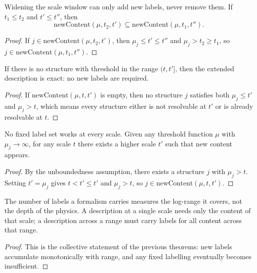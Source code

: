\begin{theorem}
Widening the scale window can only add new labels, never remove them. If $t_1 \leq t_2$ and $t' \leq t''$, then
\[\text{newContent}(\mu, t_2, t') \subseteq \text{newContent}(\mu, t_1, t'').\]
\end{theorem}
\begin{proof}
If $j \in \text{newContent}(\mu, t_2, t')$, then $\mu_j \leq t' \leq t''$ and $\mu_j > t_2 \geq t_1$, so $j \in \text{newContent}(\mu, t_1, t'')$.
\end{proof}

\begin{theorem}
If there is no structure with threshold in the range $(t, t']$, then the extended description is exact:
no new labels are required.
\end{theorem}
\begin{proof}
If $\text{newContent}(\mu, t, t')$ is empty, then no structure $j$ satisfies both $\mu_j \leq t'$ and $\mu_j > t$,
which means every structure either is not resolvable at $t'$ or is already resolvable at $t$.
\end{proof}

\begin{theorem}
No fixed label set works at every scale. Given any threshold function $\mu$ with $\mu_j \to \infty$,
for any scale $t$ there exists a higher scale $t'$ such that new content appears.
\end{theorem}
\begin{proof}
By the unboundedness assumption, there exists a structure $j$ with $\mu_j > t$. Setting $t' = \mu_j$ gives
$t < t' \leq t'$ and $\mu_j > t$, so $j \in \text{newContent}(\mu, t, t')$.
\end{proof}

\begin{theorem}
The number of labels a formalism carries measures the log-range it covers, not the depth of the physics.
A description at a single scale needs only the content of that scale; a description across a range
must carry labels for all content across that range.
\end{theorem}
\begin{proof}
This is the collective statement of the previous theorems: new labels accumulate monotonically with range,
and any fixed labelling eventually becomes insufficient.
\end{proof}

